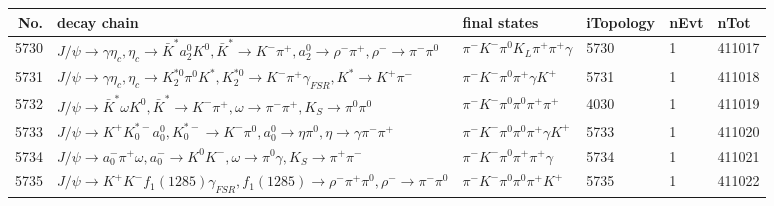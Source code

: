 \begin{table}[htbp] 
\begin{center}
\begin{small}
\begin{tabular}{rlllll}\hline\hline
 No. & decay chain & final states &  iTopology & nEvt & nTot \\\hline
5730&$J/\psi       \rightarrow \gamma       \eta_{c}    , \eta_{c}     \rightarrow \bar{K}^{*}   a_{2}^{0}      K^{0}          , \bar{K}^{*}    \rightarrow K^{-}          \pi^{+}        , a_{2}^{0}       \rightarrow \rho^{-}      \pi^{+}        , \rho^{-}       \rightarrow \pi^{-}        \pi^{0}        $&$\pi^{-}        K^{-}          \pi^{0}        K_{L}          \pi^{+}        \pi^{+}        \gamma       $& 5730&    1&411017\\
5731&$J/\psi       \rightarrow \gamma       \eta_{c}    , \eta_{c}     \rightarrow K_2^{*0}       \pi^{0}        K^{*}          , K_2^{*0}        \rightarrow K^{-}          \pi^{+}        \gamma_{FSR} , K^{*}           \rightarrow K^{+}          \pi^{-}        $&$\pi^{-}        K^{-}          \pi^{0}        \pi^{+}        \gamma       K^{+}          $& 5731&    1&411018\\
5732&$J/\psi       \rightarrow \bar{K}^{*}   \omega         K^{0}          , \bar{K}^{*}    \rightarrow K^{-}          \pi^{+}        , \omega          \rightarrow \pi^{-}        \pi^{+}        , K_{S}           \rightarrow \pi^{0}        \pi^{0}        $&$\pi^{-}        K^{-}          \pi^{0}        \pi^{0}        \pi^{+}        \pi^{+}        $& 4030&    1&411019\\
5733&$J/\psi       \rightarrow K^{+}          K_{0}^{*-}     a_{0}^{0}      , K_{0}^{*-}      \rightarrow K^{-}          \pi^{0}        , a_{0}^{0}       \rightarrow \eta          \pi^{0}        , \eta           \rightarrow \gamma       \pi^{-}        \pi^{+}        $&$\pi^{-}        K^{-}          \pi^{0}        \pi^{0}        \pi^{+}        \gamma       K^{+}          $& 5733&    1&411020\\
5734&$J/\psi       \rightarrow a_{0}^{-}      \pi^{+}        \omega         , a_{0}^{-}       \rightarrow K^{0}          K^{-}          , \omega          \rightarrow \pi^{0}        \gamma       , K_{S}           \rightarrow \pi^{+}        \pi^{-}        $&$\pi^{-}        K^{-}          \pi^{0}        \pi^{+}        \pi^{+}        \gamma       $& 5734&    1&411021\\
5735&$J/\psi       \rightarrow K^{+}          K^{-}          f_{1}(1285)    \gamma_{FSR} , f_{1}(1285)     \rightarrow \rho^{-}      \pi^{+}        \pi^{0}        , \rho^{-}       \rightarrow \pi^{-}        \pi^{0}        $&$\pi^{-}        K^{-}          \pi^{0}        \pi^{0}        \pi^{+}        K^{+}          $& 5735&    1&411022\\

\end{tabular}
\end{small}
\end{center}
\end{table}
